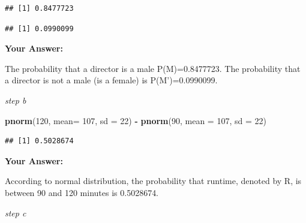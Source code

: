 \documentclass[
]{article}
\newenvironment{Shaded}{\begin{snugshade}}{\end{snugshade}}
\newcommand{\AttributeTok}[1]{\textcolor[rgb]{0.13,0.29,0.53}{#1}}
\newcommand{\DecValTok}[1]{\textcolor[rgb]{0.00,0.00,0.81}{#1}}
\newcommand{\FunctionTok}[1]{\textcolor[rgb]{0.13,0.29,0.53}{\textbf{#1}}}
\newcommand{\NormalTok}[1]{#1}
\newcommand{\OtherTok}[1]{\textcolor[rgb]{0.56,0.35,0.01}{#1}}
\newcommand{\SpecialCharTok}[1]{\textcolor[rgb]{0.81,0.36,0.00}{\textbf{#1}}}
\newcommand{\StringTok}[1]{\textcolor[rgb]{0.31,0.60,0.02}{#1}}
\begin{document}
\begin{verbatim}
## [1] 0.8477723
\end{verbatim}

\begin{Shaded}
\end{Shaded}

\begin{verbatim}
## [1] 0.0990099
\end{verbatim}

\textbf{Your Answer:}

The probability that a director is a male P(M)=0.8477723. The
probability that a director is not a male (is a female) is
P(M')=0.0990099.

\emph{step b}

\begin{Shaded}
\begin{Highlighting}[]
\FunctionTok{pnorm}\NormalTok{(}\DecValTok{120}\NormalTok{, }\AttributeTok{mean=} \DecValTok{107}\NormalTok{, }\AttributeTok{sd =} \DecValTok{22}\NormalTok{) }\SpecialCharTok{{-}} \FunctionTok{pnorm}\NormalTok{(}\DecValTok{90}\NormalTok{, }\AttributeTok{mean =} \DecValTok{107}\NormalTok{, }\AttributeTok{sd =} \DecValTok{22}\NormalTok{)}
\end{Highlighting}
\end{Shaded}

\begin{verbatim}
## [1] 0.5028674
\end{verbatim}

\textbf{Your Answer:}

According to normal distribution, the probability that runtime, denoted
by R, is between 90 and 120 minutes is 0.5028674.

\emph{step c}

\begin{Shaded}
\end{Shaded}
\end{document}
